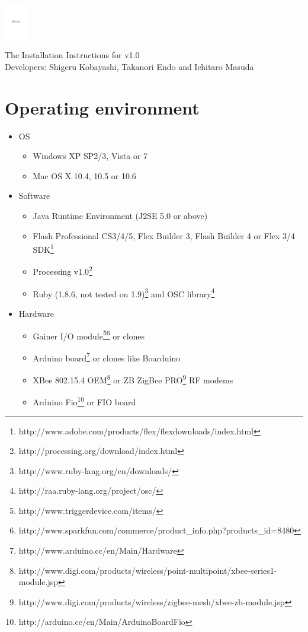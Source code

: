 \documentclass[9pt]{jsarticle}
\begin{document}
\hspace{-8.5pt}\includegraphics[cropboxonly, height=1.5cm, clip]{funnel_logo.pdf}

\vspace{8pt}

\hspace{-8.5pt}\textsf{{\large The Installation Instructions for v1.0}\\Developers: Shigeru Kobayashi, Takanori Endo and Ichitaro Masuda}

\vspace{8pt}

\section{Operating environment}
\begin{itemize}
\item OS
	\begin{itemize}
	\item Windows XP SP2/3, Vista or 7
	\item Mac OS X 10.4, 10.5 or 10.6
	\end{itemize}
\item Software
	\begin{itemize}
	\item Java Runtime Environment (J2SE 5.0 or above)
	\item Flash Professional CS3/4/5, Flex Builder 3, Flash Builder 4 or Flex 3/4 SDK\footnote{http://www.adobe.com/products/flex/flexdownloads/index.html}
	\item Processing v1.0\footnote{http://processing.org/download/index.html}
	\item Ruby (1.8.6, not tested on 1.9)\footnote{http://www.ruby-lang.org/en/downloads/} and OSC library\footnote{http://raa.ruby-lang.org/project/osc/}
	\end{itemize}
\item Hardware
	\begin{itemize}
	\item Gainer I/O module\footnote{http://www.triggerdevice.com/items/}\footnote{http://www.sparkfun.com/commerce/product\_info.php?products\_id=8480} or clones
	\item Arduino board\footnote{http://www.arduino.cc/en/Main/Hardware} or clones like Boarduino
	\item XBee 802.15.4 OEM\footnote{http://www.digi.com/products/wireless/point-multipoint/xbee-series1-module.jsp} or ZB ZigBee PRO\footnote{http://www.digi.com/products/wireless/zigbee-mesh/xbee-zb-module.jsp} RF modems
	\item Arduino Fio\footnote{http://arduino.cc/en/Main/ArduinoBoardFio} or FIO board
	\end{itemize}
\end{itemize}
\end{document}
